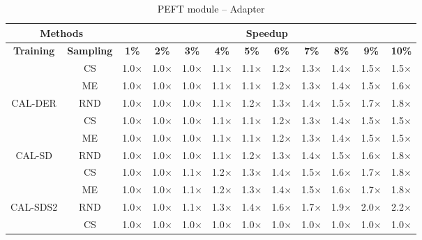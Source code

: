 \begin{table}[htbp]
\centering
\begin{subtable}{\linewidth}
\centering
\caption{PEFT module -- Adapter}

\begin{tabular}{c|c|cccccccccc}
\toprule
\multicolumn{2}{c|}{\textbf{Methods}} & \multicolumn{10}{c}{\textbf{Speedup}} \\
\midrule
\textbf{Training} & \textbf{Sampling} & \textbf{1\%} & \textbf{2\%} & \textbf{3\%} & \textbf{4\%} & \textbf{5\%} & \textbf{6\%} & \textbf{7\%} & \textbf{8\%} & \textbf{9\%} & \textbf{10\%}\\
\midrule
 & CS & 1.0$\times$ & 1.0$\times$ & 1.0$\times$ & 1.1$\times$ & 1.1$\times$ & 1.2$\times$ & 1.3$\times$ & 1.4$\times$ & 1.5$\times$ & 1.5$\times$\\

 & ME & 1.0$\times$ & 1.0$\times$ & 1.0$\times$ & 1.1$\times$ & 1.1$\times$ & 1.2$\times$ & 1.3$\times$ & 1.4$\times$ & 1.5$\times$ & 1.6$\times$\\

\multirow{-3}{*}{\raggedright\arraybackslash CAL-DER} & RND & 1.0$\times$ & 1.0$\times$ & 1.0$\times$ & 1.1$\times$ & 1.2$\times$ & 1.3$\times$ & 1.4$\times$ & 1.5$\times$ & 1.7$\times$ & 1.8$\times$\\
\midrule
 & CS & 1.0$\times$ & 1.0$\times$ & 1.0$\times$ & 1.1$\times$ & 1.1$\times$ & 1.2$\times$ & 1.3$\times$ & 1.4$\times$ & 1.5$\times$ & 1.5$\times$\\

 & ME & 1.0$\times$ & 1.0$\times$ & 1.0$\times$ & 1.1$\times$ & 1.1$\times$ & 1.2$\times$ & 1.3$\times$ & 1.4$\times$ & 1.5$\times$ & 1.5$\times$\\

\multirow{-3}{*}{\raggedright\arraybackslash CAL-SD} & RND & 1.0$\times$ & 1.0$\times$ & 1.0$\times$ & 1.1$\times$ & 1.2$\times$ & 1.3$\times$ & 1.4$\times$ & 1.5$\times$ & 1.6$\times$ & 1.8$\times$\\
\midrule
 & CS & 1.0$\times$ & 1.0$\times$ & 1.1$\times$ & 1.2$\times$ & 1.3$\times$ & 1.4$\times$ & 1.5$\times$ & 1.6$\times$ & 1.7$\times$ & 1.8$\times$\\

 & ME & 1.0$\times$ & 1.0$\times$ & 1.1$\times$ & 1.2$\times$ & 1.3$\times$ & 1.4$\times$ & 1.5$\times$ & 1.6$\times$ & 1.7$\times$ & 1.8$\times$\\

\multirow{-3}{*}{\raggedright\arraybackslash CAL-SDS2} & RND & 1.0$\times$ & 1.0$\times$ & 1.1$\times$ & 1.3$\times$ & 1.4$\times$ & 1.6$\times$ & 1.7$\times$ & 1.9$\times$ & 2.0$\times$ & 2.2$\times$\\
\midrule
 & CS & 1.0$\times$ & 1.0$\times$ & 1.0$\times$ & 1.0$\times$ & 1.0$\times$ & 1.0$\times$ & 1.0$\times$ & 1.0$\times$ & 1.0$\times$ & 1.0$\times$\\


\end{tabular}
\end{subtable}
\end{table}
